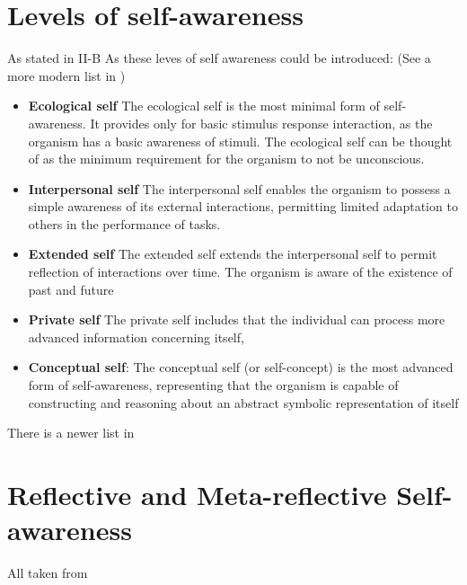 \documentclass{article}
\begin{document}
		\section{Levels of self-awareness}
			As stated in
			\cite{lewis-2011-a-survey-of-self-awareness-and-its-application-in-computing-systems} II-B
			As \citet{neisser-1997-the-roots-of-self-knowledge-perceiving-self-it-and-thou} these leves of self awareness could be introduced: (See a more modern list in \cite{lewis-2017-towards-a-framework-for-the-levels-and-aspects-of-self-aware-computing-systems})
			\begin{itemize}
				\item \textbf{Ecological self} The ecological self is the most minimal form of
				self-awareness. It provides only for basic stimulus	response interaction, as the organism has a basic
				awareness of stimuli. The ecological self can be
				thought of as the minimum requirement for the organism to not be unconscious.
				
				\item \textbf{Interpersonal self} The interpersonal self enables the organism to possess
				a simple awareness of its external interactions, permitting limited adaptation to others in the performance of
				tasks.
				
				\item \textbf{Extended self}
				The extended self extends the interpersonal self to
				permit reflection of interactions over time. The organism is aware of the existence of past and future
				
				\item \textbf{Private self}
				The private self includes that the individual can process more advanced information concerning itself,
				
				\item \textbf{Conceptual self}: The conceptual self (or self-concept) is the most
				advanced form of self-awareness, representing that
				the organism is capable of constructing and reasoning
				about an abstract symbolic representation of itself
			\end{itemize}
			There is a newer list in \cite{lewis-2017-towards-a-framework-for-the-levels-and-aspects-of-self-aware-computing-systems}
		\section{Reflective and Meta-reflective Self-awareness}
			All taken from \cite{lewis-2017-towards-a-framework-for-the-levels-and-aspects-of-self-aware-computing-systems}
\end{document}

